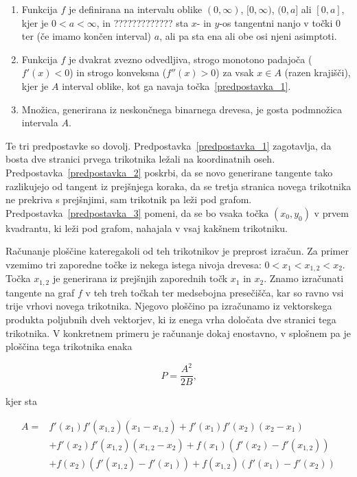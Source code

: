 \documentclass[a4paper, 12pt, titlepage]{article}
\begin{document}
\begin{enumerate}
    \item \label{predpostavka_1} Funkcija $ f $ je definirana na intervalu oblike $(0, \infty)$, $[0,\infty)$, $(0,a]$ ali $[0,a]$, kjer je $ 0 < a < \infty $, in ????????????? sta $x$- in $y$-os tangentni nanjo v točki 0 ter (če imamo končen interval) $a$, ali pa sta ena ali obe osi njeni asimptoti.
    \item \label{predpostavka_2} Funkcija $ f $ je dvakrat zvezno odvedljiva, strogo monotono padajoča ($ f'(x) < 0 $) in strogo konveksna ($ f''(x) > 0 $) za vsak $ x \in A$ (razen krajišči), kjer je $ A $ interval oblike, kot ga navaja točka~\ref{predpostavka_1}.
    \item \label{predpostavka_3} Množica, generirana iz neskončnega binarnega drevesa, je gosta podmnožica intervala $ A $.
\end{enumerate}

Te tri predpostavke so dovolj. Predpostavka~\ref{predpostavka_1} zagotavlja, da bosta dve stranici prvega trikotnika ležali na koordinatnih oseh. Predpostavka~\ref{predpostavka_2} poskrbi, da se novo generirane tangente tako razlikujejo od tangent iz prejšnjega koraka, da se tretja stranica novega trikotnika ne prekriva s prejšnjimi, sam trikotnik pa leži pod grafom. Predpostavka~\ref{predpostavka_3} pomeni, da se bo vsaka točka $ (x_0, y_0) $ v prvem kvadrantu, ki leži pod grafom, nahajala v vsaj kakšnem trikotniku.

Računanje ploščine kateregakoli od teh trikotnikov je preprost izračun. Za primer vzemimo tri zaporedne točke iz nekega istega nivoja drevesa: $ 0 < x_1 < x_{1,2} < x_2 $. Točka $ x_{1,2} $ je generirana iz prejšnjih zaporednih točk $ x_1 $ in $ x_2 $. Znamo izračunati tangente na graf $ f $ v teh treh točkah ter medsebojna presečišča, kar so ravno vsi trije vrhovi novega trikotnika. Njegovo ploščino pa izračunamo iz vektorskega produkta poljubnih dveh vektorjev, ki iz enega vrha določata dve stranici tega trikotnika. V konkretnem primeru je računanje dokaj enostavno, v splošnem pa je ploščina tega trikotnika enaka 

\begin{equation}
    \label{splosna_ploscina_formula}
    P = \frac{A^2}{2B}\text{,}
\end{equation}

kjer sta

\begin{align*}
    A =  &f'(x_1)f'(x_{1,2})(x_1 - x_{1,2}) + f'(x_1)f'(x_2)(x_2 - x_1) \\
&+ f'(x_2)f'(x_{1,2})(x_{1,2} - x_2) + f(x_1)(f'(x_2) - f'(x_{1,2})) \\
&+ f(x_2)(f'(x_{1,2}) - f'(x_1)) + f(x_{1,2})(f'(x_1) - f'(x_2))
\end{align*}
\end{document}
